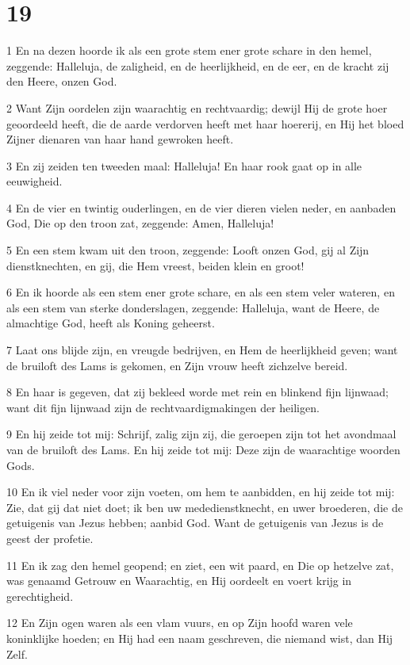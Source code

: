 \chapter{19}

\par 1 En na dezen hoorde ik als een grote stem ener grote schare in den hemel, zeggende: Halleluja, de zaligheid, en de heerlijkheid, en de eer, en de kracht zij den Heere, onzen God.
\par 2 Want Zijn oordelen zijn waarachtig en rechtvaardig; dewijl Hij de grote hoer geoordeeld heeft, die de aarde verdorven heeft met haar hoererij, en Hij het bloed Zijner dienaren van haar hand gewroken heeft.
\par 3 En zij zeiden ten tweeden maal: Halleluja! En haar rook gaat op in alle eeuwigheid.
\par 4 En de vier en twintig ouderlingen, en de vier dieren vielen neder, en aanbaden God, Die op den troon zat, zeggende: Amen, Halleluja!
\par 5 En een stem kwam uit den troon, zeggende: Looft onzen God, gij al Zijn dienstknechten, en gij, die Hem vreest, beiden klein en groot!
\par 6 En ik hoorde als een stem ener grote schare, en als een stem veler wateren, en als een stem van sterke donderslagen, zeggende: Halleluja, want de Heere, de almachtige God, heeft als Koning geheerst.
\par 7 Laat ons blijde zijn, en vreugde bedrijven, en Hem de heerlijkheid geven; want de bruiloft des Lams is gekomen, en Zijn vrouw heeft zichzelve bereid.
\par 8 En haar is gegeven, dat zij bekleed worde met rein en blinkend fijn lijnwaad; want dit fijn lijnwaad zijn de rechtvaardigmakingen der heiligen.
\par 9 En hij zeide tot mij: Schrijf, zalig zijn zij, die geroepen zijn tot het avondmaal van de bruiloft des Lams. En hij zeide tot mij: Deze zijn de waarachtige woorden Gods.
\par 10 En ik viel neder voor zijn voeten, om hem te aanbidden, en hij zeide tot mij: Zie, dat gij dat niet doet; ik ben uw mededienstknecht, en uwer broederen, die de getuigenis van Jezus hebben; aanbid God. Want de getuigenis van Jezus is de geest der profetie.
\par 11 En ik zag den hemel geopend; en ziet, een wit paard, en Die op hetzelve zat, was genaamd Getrouw en Waarachtig, en Hij oordeelt en voert krijg in gerechtigheid.
\par 12 En Zijn ogen waren als een vlam vuurs, en op Zijn hoofd waren vele koninklijke hoeden; en Hij had een naam geschreven, die niemand wist, dan Hij Zelf.
